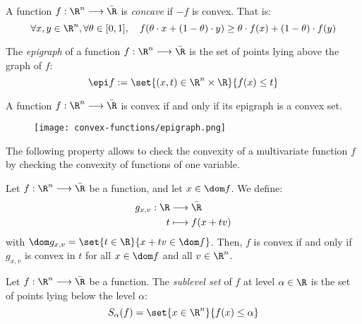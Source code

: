 \begin{definition}
    A function $f:\R^n\longrightarrow\bar{\R}$ is \emph{concave} if $-f$ is convex. That is:
    \begin{equation*}
        \forall x,y\in\R^n, \forall\theta\in[0,1], \quad f(\theta\cdot x + (1-\theta)\cdot y) \geq \theta\cdot f(x) + (1-\theta)\cdot f(y)
    \end{equation*}
\end{definition}

\begin{definition}[Epigraph]
    The \emph{epigraph} of a function $f:\R^n\longrightarrow\bar{\R}$ is the set of points lying above the graph of $f$:
    \begin{equation}
        \epi f := \set{(x, t)\in\R^n\times\R}{f(x)\leq t}
    \end{equation}
\end{definition}

\begin{property}
    A function $f:\R^n\longrightarrow\bar{\R}$ is convex if and only if its epigraph is a convex set.

    \begin{figure}[H]
        \centering
        \texttt{[image: convex-functions/epigraph.png]}
    \end{figure}
\end{property}

The following property allows to check the convexity of a multivariate function $f$ by checking the convexity of functions of one variable.
\begin{property}
    \label{prop:convexity-1d}
    Let $f:\R^n\longrightarrow\bar{\R}$ be a function, and let $x\in\dom f$. We define:
    \begin{equation*}
        \begin{aligned}
            g_{x,v} : \R &\longrightarrow \bar{\R} \\
            t &\longmapsto f(x+tv)
        \end{aligned}
    \end{equation*}
    with $\dom g_{x,v} = \set{t\in\R}{x+tv\in\dom f}$. Then, $f$ is convex if and only if $g_{x,v}$ is convex in $t$ for all $x\in\dom f$ and all $v\in\R^n$.
\end{property}

\begin{definition}
    Let $f:\R^n\longrightarrow\bar{\R}$ be a function. The \emph{sublevel set} of $f$ at level $\alpha\in\R$ is the set of points lying below the level $\alpha$:
    \begin{equation*}
        S_\alpha(f) = \set{x\in\R^n}{f(x)\leq\alpha}
    \end{equation*}
\end{definition}

